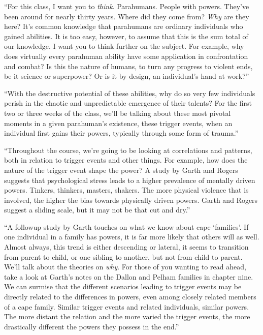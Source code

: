 ``For this class, I want you to \emph{think}.  Parahumans.  People with powers.  They've been around for nearly thirty years.  Where did they come from?  \emph{Why} are they here?  It's common knowledge that parahumans are ordinary individuals who gained abilities.  It is too easy, however, to assume that this is the sum total of our knowledge.  I want you to think further on the subject.  For example, why does virtually every parahuman ability have some application in confrontation and combat?  Is this the nature of humans, to turn any progress to violent ends, be it science or superpower?  Or is it by design, an individual's hand at work?''



``With the destructive potential of these abilities, why do so very few individuals perish in the chaotic and unpredictable emergence of their talents?  For the first two or three weeks of the class, we'll be talking about these most pivotal moments in a given parahuman's existence, these trigger events, when an individual first gains their powers, typically through some form of trauma.''



``Throughout the course, we're going to be looking at correlations and patterns, both in relation to trigger events and other things.  For example, how does the nature of the trigger event shape the power?  A study by Garth and Rogers suggests that psychological stress leads to a higher prevalence of mentally driven powers.  Tinkers, thinkers, masters, shakers.  The more physical violence that is involved, the higher the bias towards physically driven powers.  Garth and Rogers suggest a sliding scale, but it may not be that cut and dry.''



``A followup study by Garth touches on what we know about cape `families'.  If one individual in a family has powers, it is far more likely that others will as well.  Almost always, this trend is either descending or lateral, it seems to transition from parent to child, or one sibling to another, but not from child to parent.  We'll talk about the theories on \emph{why}.  For those of you wanting to read ahead, take a look at Garth's notes on the Dallon and Pelham families in chapter nine.  We can surmise that the different scenarios leading to trigger events may be directly related to the differences in powers, even among closely related members of a cape family.  Similar trigger events and related individuals, similar powers.  The more distant the relation and the more varied the trigger events, the more drastically different the powers they possess in the end.''



